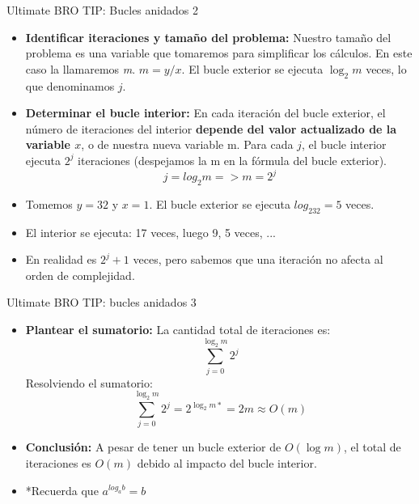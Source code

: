 \documentclass[aspectratio=169]{beamer}
\begin{document}
\begin{frame}{Ultimate BRO TIP: Bucles anidados 2}
\begin{itemize}
    \item \textbf{Identificar iteraciones y tamaño del problema:} 
    Nuestro tamaño del problema es una variable que tomaremos para simplificar los cálculos. En este caso la llamaremos \textit{m}. \(m = y/x\). El bucle exterior se ejecuta $\log_2 m$ veces, lo que denominamos $j$.
    
    \item \textbf{Determinar el bucle interior:} 
    En cada iteración del bucle exterior, el número de iteraciones del interior \textbf{depende del valor actualizado de la variable $x$}, o de nuestra nueva variable m. 
    Para cada $j$, el bucle interior ejecuta $2^j$ iteraciones (despejamos la m en la fórmula del bucle exterior).
    \[ j = log_2 m  => m = 2^j \]

    \item Tomemos \(y = 32\) y \(x = 1\). El bucle exterior se ejecuta \(log_232 = 5\) veces.
    \item El interior se ejecuta: 17 veces, luego 9, 5 veces, ...
    \item En realidad es \(2^j + 1\) veces, pero sabemos que una iteración no afecta al orden de complejidad.
\end{itemize}
\end{frame}

\begin{frame}{Ultimate BRO TIP: bucles anidados 3}
\begin{itemize}

    \item \textbf{Plantear el sumatorio:} 
    La cantidad total de iteraciones es:
    \[
        \sum_{j=0}^{\log_2 m} 2^j
    \]
    Resolviendo el sumatorio:
    \[
        \sum_{j=0}^{\log_2 m} 2^j = 2^{\log_2 m* } = 2m  \approx O(m)
    \]
    
    \item \textbf{Conclusión:} 
    A pesar de tener un bucle exterior de $O(\log m)$, el total de iteraciones es $O(m)$ debido al impacto del bucle interior.
    \item *Recuerda que \(a^{log_ab} = b\)
\end{itemize}
\end{frame}
\end{document}
